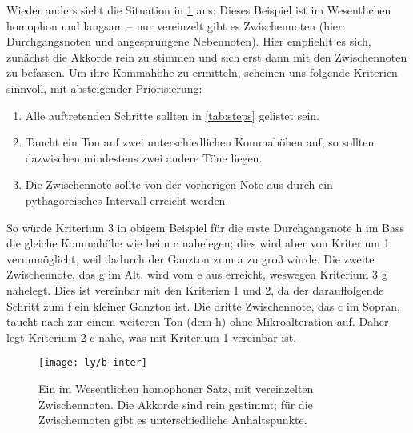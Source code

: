 Wieder anders sieht die Situation in \cref{fig:inter} aus: Dieses Beispiel ist
im Wesentlichen homophon und langsam – nur vereinzelt gibt es Zwischennoten
(hier: Durchgangsnoten und angesprungene Nebennoten). Hier empfiehlt es sich,
zunächst die Akkorde rein zu stimmen und sich erst dann mit den Zwischennoten zu
befassen. Um ihre Kommahöhe zu ermitteln, scheinen uns folgende Kriterien
sinnvoll, mit absteigender Priorisierung:
\begin{enumerate}
\item Alle auftretenden Schritte sollten in \cref{tab:steps} gelistet sein.
\item Taucht ein Ton auf zwei unterschiedlichen Kommahöhen auf, so sollten
  dazwischen mindestens zwei andere Töne liegen.
\item Die Zwischennote sollte von der vorherigen Note aus durch ein
  pythagoreisches Intervall erreicht werden.
\end{enumerate}
So würde Kriterium 3 in obigem Beispiel für die erste Durchgangsnote h im Bass
die gleiche Kommahöhe wie beim c nahelegen; dies wird aber von Kriterium 1
verunmöglicht, weil dadurch der Ganzton zum \naturalm a zu groß würde. Die
zweite Zwischennote, das g im Alt, wird vom \naturalm e aus erreicht, weswegen
Kriterium 3 \naturalm g nahelegt. Dies ist vereinbar mit den Kriterien 1 und 2,
da der darauffolgende Schritt zum f ein kleiner Ganzton ist. Die dritte
Zwischennote, das c im Sopran, taucht nach zur einem weiteren Ton (dem \naturalm
h) ohne Mikroalteration auf. Daher legt Kriterium 2 \natural c nahe, was mit
Kriterium 1 vereinbar ist.


\begin{figure}
  \centering
  \texttt{[image: ly/b-inter]}
  \caption{Ein im Wesentlichen homophoner Satz, mit vereinzelten
    Zwischennoten. Die Akkorde sind rein gestimmt; für die Zwischennoten gibt
    es unterschiedliche Anhaltspunkte.}\label{fig:inter}
\end{figure}


